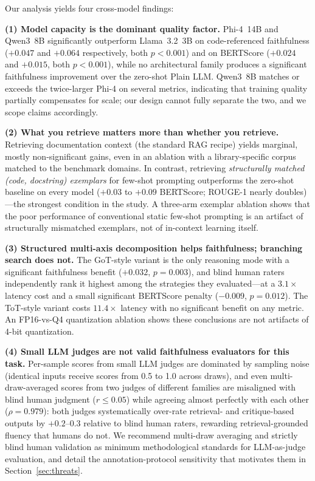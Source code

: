 \documentclass[pdflatex,sn-mathphys-ay]{sn-jnl}%
\theoremstyle{thmstyleone}%
\theoremstyle{thmstyletwo}%
\theoremstyle{thmstylethree}%
\begin{document}
{Our analysis yields four cross-model findings:

\textbf{(1) Model capacity is the dominant quality factor.} Phi-4~14B and Qwen3~8B significantly outperform Llama~3.2~3B on code-referenced faithfulness ($+0.047$ and $+0.064$ respectively, both $p<0.001$) and on BERTScore ($+0.024$ and $+0.015$, both $p<0.001$), while no architectural family produces a significant faithfulness improvement over the zero-shot Plain LLM. Qwen3~8B matches or exceeds the twice-larger Phi-4 on several metrics, indicating that training quality partially compensates for scale; our design cannot fully separate the two, and we scope claims accordingly.

\textbf{(2) What you retrieve matters more than whether you retrieve.} Retrieving documentation context (the standard RAG recipe) yields marginal, mostly non-significant gains, even in an ablation with a library-specific corpus matched to the benchmark domains. In contrast, retrieving \emph{structurally matched (code, docstring) exemplars} for few-shot prompting outperforms the zero-shot baseline on every model ($+0.03$ to $+0.09$ BERTScore; ROUGE-1 nearly doubles)---the strongest condition in the study. A three-arm exemplar ablation shows that the poor performance of conventional static few-shot prompting is an artifact of structurally mismatched exemplars, not of in-context learning itself.

\textbf{(3) Structured multi-axis decomposition helps faithfulness; branching search does not.} The GoT-style variant is the only reasoning mode with a significant faithfulness benefit ($+0.032$, $p=0.003$), and blind human raters independently rank it highest among the strategies they evaluated---at a $3.1\times$ latency cost and a small significant BERTScore penalty ($-0.009$, $p=0.012$). The ToT-style variant costs $11.4\times$ latency with no significant benefit on any metric. An FP16-vs-Q4 quantization ablation shows these conclusions are not artifacts of 4-bit quantization.

\textbf{(4) Small LLM judges are not valid faithfulness evaluators for this task.} Per-sample scores from small LLM judges are dominated by sampling noise (identical inputs receive scores from 0.5 to 1.0 across draws), and even multi-draw-averaged scores from two judges of different families are misaligned with blind human judgment ($r\le0.05$) while agreeing almost perfectly with each other ($\rho=0.979$): both judges systematically over-rate retrieval- and critique-based outputs by $+0.2$--$0.3$ relative to blind human raters, rewarding retrieval-grounded fluency that humans do not. We recommend multi-draw averaging and strictly blind human validation as minimum methodological standards for LLM-as-judge evaluation, and detail the annotation-protocol sensitivity that motivates them in Section~\ref{sec:threats}.

}
\end{document}
